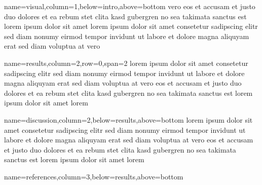 \documentclass[landscape,specialSize,fontscale=0.3]{baposter}
\begin{document}
\begin{poster}
  {name=visual,column=1,below=intro,above=bottom}{
    vero eos et accusam et justo duo dolores et ea rebum stet clita kasd
    gubergren no sea takimata sanctus est lorem ipsum dolor sit amet lorem ipsum
    dolor sit amet consetetur sadipscing elitr sed diam nonumy eirmod tempor
    invidunt ut labore et dolore magna aliquyam erat sed diam voluptua at vero
  }


  {name=results,column=2,row=0,span=2}{
    lorem ipsum dolor sit amet consetetur sadipscing elitr sed diam nonumy
    eirmod tempor invidunt ut labore et dolore magna aliquyam erat sed diam
    voluptua at vero eos et accusam et justo duo dolores et ea rebum stet clita
    kasd gubergren no sea takimata sanctus est lorem ipsum dolor sit amet lorem
  }

  {name=discussion,column=2,below=results,above=bottom}{
    lorem ipsum dolor sit amet consetetur sadipscing elitr sed diam nonumy
    eirmod tempor invidunt ut labore et dolore magna aliquyam erat sed diam
    voluptua at vero eos et accusam et justo duo dolores et ea rebum stet clita
    kasd gubergren no sea takimata sanctus est lorem ipsum dolor sit amet lorem
  }

  {name=references,column=3,below=results,above=bottom}{
    
    
  }

\end{poster}
\end{document}
